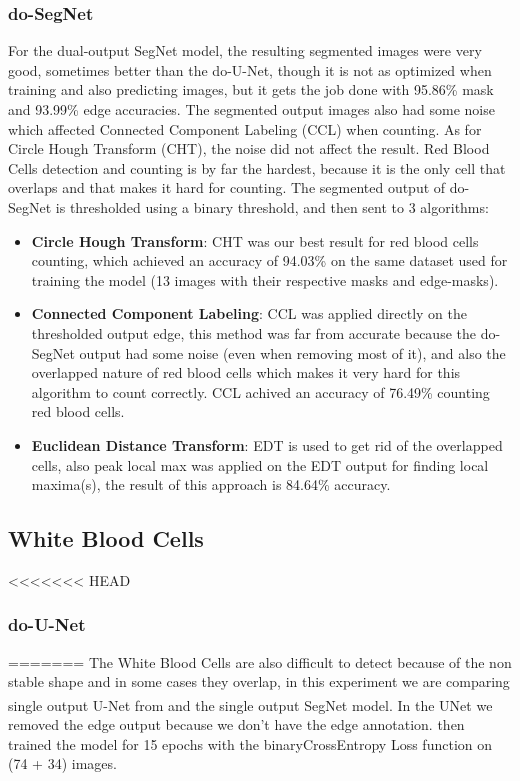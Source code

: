 

\subsubsection{do-SegNet}
For the dual-output SegNet model, the resulting segmented images were very good, sometimes better than the do-U-Net, though it is not as optimized when training and also predicting images, but it gets the job done with 95.86\% mask and 93.99\% edge accuracies. The segmented output images also had some noise which affected Connected Component Labeling (CCL) when counting.
As for Circle Hough Transform (CHT), the noise did not affect the result.
Red Blood Cells detection and counting is by far the hardest, because it is the only cell that overlaps and that makes it hard for counting.
The segmented output of do-SegNet is thresholded using a binary threshold, and then sent to 3 algorithms:

\begin{itemize}
  \item \textbf{Circle Hough Transform}: CHT was our best result for red blood cells counting, which achieved an accuracy of 94.03\% on the same dataset used for training the model (13 images with their respective masks and edge-masks).
  \item \textbf{Connected Component Labeling}: CCL was applied directly on the thresholded output edge, this method was far from accurate because the do-SegNet output had some noise (even when removing most of it), and also the overlapped nature of red blood cells which makes it very hard for this algorithm to count correctly. CCL achived an accuracy of 76.49\% counting red blood cells.
  \item \textbf{Euclidean Distance Transform}: EDT is used to get rid of the overlapped cells, also peak local max was applied on the EDT output for finding local maxima(s), the result of this approach is 84.64\% accuracy.
\end{itemize}



\subsection{White Blood Cells}
<<<<<<< HEAD
\subsubsection{do-U-Net}
=======
The White Blood Cells are also difficult to detect because of the non stable shape and in some cases they overlap, in this experiment we are comparing single output U-Net from \textsuperscript{\cite{10.1007/978-3-030-44584-3_31}} and the single output SegNet model.
In the UNet we removed the edge output because we don't have the edge annotation. then trained the model for 15 epochs with the binaryCrossEntropy Loss function on (74 + 34) images.

